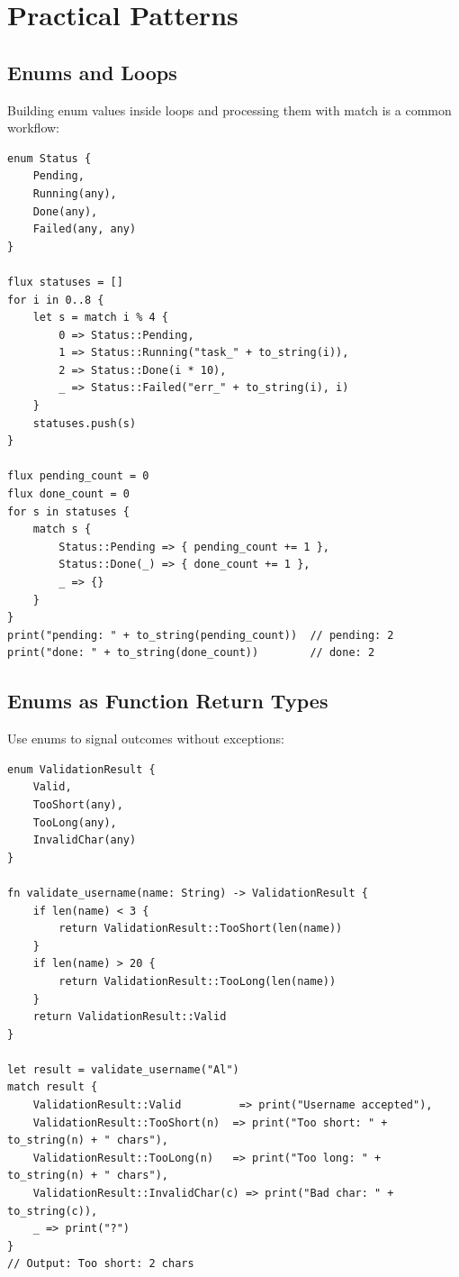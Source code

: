 \section{Practical Patterns}\label{sec:enum-practical}

\subsection{Enums and Loops}

Building enum values inside loops and processing them with match is a
common workflow:

\begin{lstlisting}[language=Lattice, caption={Batch-constructing enums}]
enum Status {
    Pending,
    Running(any),
    Done(any),
    Failed(any, any)
}

flux statuses = []
for i in 0..8 {
    let s = match i % 4 {
        0 => Status::Pending,
        1 => Status::Running("task_" + to_string(i)),
        2 => Status::Done(i * 10),
        _ => Status::Failed("err_" + to_string(i), i)
    }
    statuses.push(s)
}

flux pending_count = 0
flux done_count = 0
for s in statuses {
    match s {
        Status::Pending => { pending_count += 1 },
        Status::Done(_) => { done_count += 1 },
        _ => {}
    }
}
print("pending: " + to_string(pending_count))  // pending: 2
print("done: " + to_string(done_count))        // done: 2
\end{lstlisting}

\subsection{Enums as Function Return Types}

Use enums to signal outcomes without exceptions:

\begin{lstlisting}[language=Lattice, caption={Validation with enums}]
enum ValidationResult {
    Valid,
    TooShort(any),
    TooLong(any),
    InvalidChar(any)
}

fn validate_username(name: String) -> ValidationResult {
    if len(name) < 3 {
        return ValidationResult::TooShort(len(name))
    }
    if len(name) > 20 {
        return ValidationResult::TooLong(len(name))
    }
    return ValidationResult::Valid
}

let result = validate_username("Al")
match result {
    ValidationResult::Valid         => print("Username accepted"),
    ValidationResult::TooShort(n)  => print("Too short: " + to_string(n) + " chars"),
    ValidationResult::TooLong(n)   => print("Too long: " + to_string(n) + " chars"),
    ValidationResult::InvalidChar(c) => print("Bad char: " + to_string(c)),
    _ => print("?")
}
// Output: Too short: 2 chars
\end{lstlisting}

